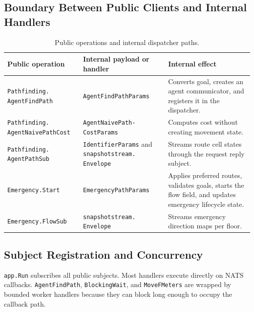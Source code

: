 \documentclass[12pt,a4paper]{report}
\begin{document}
\subsection{Boundary Between Public Clients and Internal Handlers}

\begin{table}[H]
\centering
\begin{tabular}{|p{}|p{}|p{}|}
\hline
\textbf{Public operation} & \textbf{Internal payload or handler} &
\textbf{Internal effect} \\
\hline
\texttt{Pathfinding.} \newline \texttt{AgentFindPath} &
\texttt{AgentFindPathParams} &
Converts goal, creates an agent communicator, and registers it in the dispatcher. \\
\hline
\texttt{Pathfinding.} \newline \texttt{AgentNaivePathCost} &
\texttt{AgentNaivePath-} \newline \texttt{CostParams} &
Computes cost without creating movement state. \\
\hline
\texttt{Pathfinding.} \newline \texttt{AgentPathSub} &
\texttt{IdentifierParams} and \texttt{snapshotstream.} \newline
\texttt{Envelope} &
Streams route cell states through the request reply subject. \\
\hline
\texttt{Emergency.Start} &
\texttt{EmergencyPathParams} &
Applies preferred routes, validates goals, starts the flow field, and updates
emergency lifecycle state. \\
\hline
\texttt{Emergency.FlowSub} &
\texttt{snapshotstream.} \newline \texttt{Envelope} &
Streams emergency direction maps per floor. \\
\hline
\end{tabular}
\caption{Public operations and internal dispatcher paths.}
\end{table}

\subsection{Subject Registration and Concurrency}

\texttt{app.Run} subscribes all public subjects. Most handlers execute directly
on NATS callbacks. \texttt{AgentFindPath}, \texttt{BlockingWait}, and
\texttt{MoveFMeters} are wrapped by bounded worker handlers because they can
block long enough to occupy the callback path.
\end{document}
